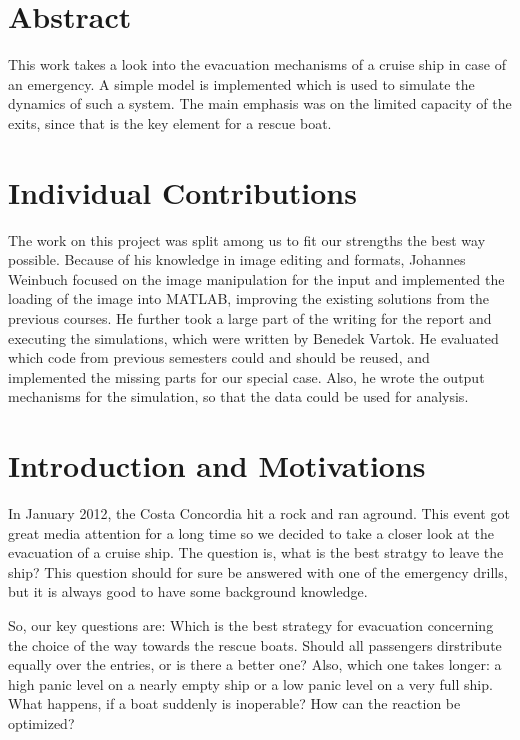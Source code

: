 \documentclass[11pt]{article}
\begin{document}
\section{Abstract}

This work takes a look into the evacuation mechanisms of a cruise ship in case
of an emergency.  A simple model is implemented which is used to simulate the
dynamics of such a system.  The main emphasis was on the limited capacity of
the exits, since that is the key element for a rescue boat. 


\section{Individual Contributions}

The work on this project was split among us to fit our strengths the best way
possible.  Because of his knowledge in image editing and formats, Johannes
Weinbuch focused on the image manipulation for the input and implemented the
loading of the image into MATLAB, improving the existing solutions from the
previous courses. He further took a large part of the writing for the report
and executing the simulations, which were written by Benedek Vartok.  He
evaluated which code from previous semesters could and should be reused, and
implemented the missing parts for our special case.  Also, he wrote the output
mechanisms for the simulation, so that the data could be used for analysis.


\section{Introduction and Motivations}

In January 2012, the Costa Concordia hit a rock and ran aground\cite{bbcnews}.
This event got great media attention for a long time so we decided to take a
closer look at the evacuation of a cruise ship.  The question is, what is the
best stratgy to leave the ship?  This question should for sure be answered with
one of the emergency drills, but it is always good to have some background
knowledge.

So, our key questions are: Which is the best strategy for evacuation concerning
the choice of the way towards the rescue boats. Should all passengers
dirstribute equally over the entries, or is there a better one? Also, which one
takes longer: a high panic level on a nearly empty ship or a low panic level on
a very full ship. What happens, if a boat suddenly is inoperable? How can the
reaction be optimized?
\end{document}

